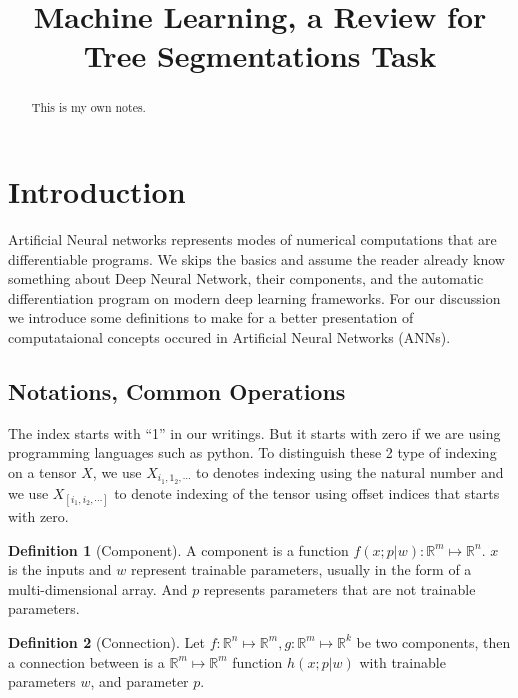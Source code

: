 \documentclass[]{article}
\title{Machine Learning, a Review for Tree Segmentations Task}
\author{}
\theoremstyle{definition}
\newtheorem{definition}{Definition}
\numberwithin{equation}{subsection}
\begin{document}
\maketitle

\begin{abstract}
    This is my own notes. 
\end{abstract}
\tableofcontents

\section{Introduction}
    Artificial Neural networks represents modes of numerical computations that are differentiable programs. 
    We skips the basics and assume the reader already know something about Deep Neural Network, their components, and the automatic differentiation program on modern deep learning frameworks. 
    For our discussion we introduce some definitions to make for a better presentation of computataional concepts occured in Artificial Neural Networks (ANNs). 
    \par
    \subsection{Notations, Common Operations}
        The index starts with ``1'' in our writings. 
        But it starts with zero if we are using programming languages such as python. 
        To distinguish these 2 type of indexing on a tensor $X$, we use $X_{i_1, 1_2, \cdots}$ to denotes indexing using the natural number and we use $X_{[i_1, i_2, \cdots]}$ to denote indexing of the tensor using offset indices that starts with zero. 
    \begin{definition}[Component]
        A component is a function $f(x; p|w): \mathbb R^m \mapsto \mathbb R^n$. 
        $x$ is the inputs and $w$ represent trainable parameters, usually in the form of a multi-dimensional array. 
        And $p$ represents parameters that are not trainable parameters. 
        
    \end{definition}
    \begin{definition}[Connection]
        Let $f:\mathbb R^n \mapsto \mathbb R^m, g: \mathbb R^m \mapsto \mathbb R^k$ be two components, then a connection between is a $\mathbb R^m \mapsto \mathbb R^m$ function $h(x; p | w)$ with trainable parameters $w$, and parameter $p$. 
    \end{definition}
\end{document}
